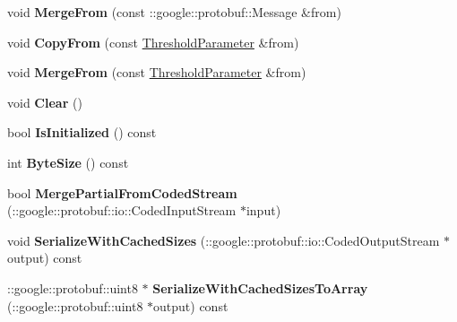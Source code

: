 \begin{DoxyCompactItemize}
\mbox{\label{classcaffe_1_1_threshold_parameter_ae7a7639d44026fe29670b202b37386ee}} 
void {\bfseries Merge\+From} (const \+::google\+::protobuf\+::\+Message \&from)
\item 
\mbox{\label{classcaffe_1_1_threshold_parameter_aa578c11ce75bacb49eb584e33b872f5b}} 
void {\bfseries Copy\+From} (const \mbox{\hyperlink{classcaffe_1_1_threshold_parameter}{Threshold\+Parameter}} \&from)
\item 
\mbox{\label{classcaffe_1_1_threshold_parameter_ac9582a6d39a35a1f577172a9b4372f6a}} 
void {\bfseries Merge\+From} (const \mbox{\hyperlink{classcaffe_1_1_threshold_parameter}{Threshold\+Parameter}} \&from)
\item 
\mbox{\label{classcaffe_1_1_threshold_parameter_a7a5a3cb9bd9c6ceeccdae77a922b8983}} 
void {\bfseries Clear} ()
\item 
\mbox{\label{classcaffe_1_1_threshold_parameter_a7e91b39cbbe91ec236c7d96b6b4b9a89}} 
bool {\bfseries Is\+Initialized} () const
\item 
\mbox{\label{classcaffe_1_1_threshold_parameter_a9e31afe055afeaf5f65221f80a1813f0}} 
int {\bfseries Byte\+Size} () const
\item 
\mbox{\label{classcaffe_1_1_threshold_parameter_a53c2d9738e305c3792857614877d38d0}} 
bool {\bfseries Merge\+Partial\+From\+Coded\+Stream} (\+::google\+::protobuf\+::io\+::\+Coded\+Input\+Stream $\ast$input)
\item 
\mbox{\label{classcaffe_1_1_threshold_parameter_ab7f0daca4248bf0c2cb23d46d1b78078}} 
void {\bfseries Serialize\+With\+Cached\+Sizes} (\+::google\+::protobuf\+::io\+::\+Coded\+Output\+Stream $\ast$output) const
\item 
\mbox{\label{classcaffe_1_1_threshold_parameter_a222b115c16fc008ae591f7a9fac72002}} 
\+::google\+::protobuf\+::uint8 $\ast$ {\bfseries Serialize\+With\+Cached\+Sizes\+To\+Array} (\+::google\+::protobuf\+::uint8 $\ast$output) const

\end{DoxyCompactItemize}
